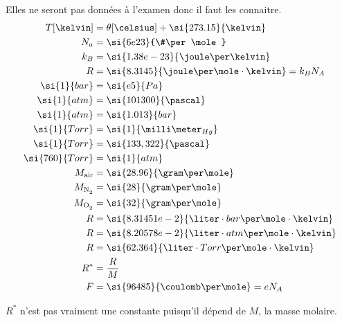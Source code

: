Elles ne seront pas données à l'examen donc il faut les connaitre.
\begin{align*}
  T[\kelvin] & = \theta[\celsius] + \si{273.15}{\kelvin}\\
  N_a & = \si{6e23}{\#\per\mole}\\
  k_B & = \si{1.38e-23}{\joule\per\kelvin}\\
  R & = \si{8.3145}{\joule\per\mole\cdot\kelvin} = k_B N_A\\
  \si{1}{bar} & = \si{e5}{Pa}\\
  \si{1}{atm} & = \si{101300}{\pascal}\\
  \si{1}{atm} & = \si{1.013}{bar}\\
  \si{1}{Torr} & = \si{1}{\milli\meter_{Hg}}\\
  \si{1}{Torr} & = \si{133,322}{\pascal}\\
  \si{760}{Torr} & = \si{1}{atm}\\
  M_\mathrm{air} & = \si{28.96}{\gram\per\mole}\\
  M_\mathrm{\ce{N2}} & = \si{28}{\gram\per\mole}\\
  M_\mathrm{\ce{O2}} & = \si{32}{\gram\per\mole}\\
  R & = \si{8.31451e-2}{\liter\cdot bar\per\mole\cdot\kelvin}\\
  R & = \si{8.20578e-2}{\liter\cdot atm\per\mole\cdot\kelvin}\\
  R & = \si{62.364}{\liter\cdot Torr\per\mole\cdot\kelvin}\\
  R^* & = \frac{R}{M}\\
  F & = \si{96485}{\coulomb\per\mole} = eN_A
\end{align*}

\begin{myrem}
$R^*$ n'est pas vraiment une constante puisqu'il dépend de $M$,
la masse molaire.
\end{myrem}

